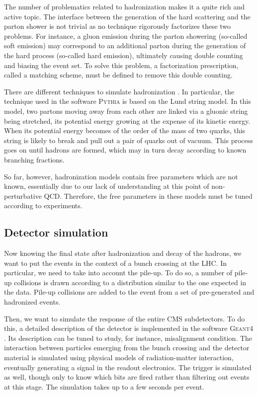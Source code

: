     The number of problematics related to hadronization makes it a quite rich and
    active topic. The interface between the generation of the hard scattering
    and the parton shower is not trivial as no technique rigorously factorizes
    these two problems. For instance, a gluon emission during
    the parton showering (so-called soft emission) may correspond to an additional
    parton during the generation of the hard process (so-called hard emission),
    ultimately causing double counting and biasing the event set. To solve this
    problem, a factorization prescription, called a matching scheme, must be defined
    to remove this double counting.

    There are different techniques to simulate hadronization \cite{MCGenPDG}. In particular, the
    technique used in the software \textsc{Pythia} is based on the Lund string
    model. In this model, two partons moving away from each other are linked
    via a gluonic string being stretched, its potential energy growing at
    the expense of its kinetic energy. When its potential energy becomes of the
    order of the mass of two quarks, this string is likely to break and pull
    out a pair of quarks out of vacuum. This process goes on until
    hadrons are formed, which may in turn decay according to known branching
    fractions.

    So far, however, hadronization models contain free parameters which are not known,
    essentially due to our lack of understanding at this point of non-perturbative
    QCD. Therefore, the free parameters in these models must be tuned according to
    experiments.

    \subsection{Detector simulation}

    Now knowing the final state after hadronization and decay of the hadrons, we
    want to put the events in the context of a bunch crossing at the LHC. In
    particular, we need to take into account the pile-up. To do so, a number of
    pile-up collisions is drawn according to a distribution similar to the
    one expected in the data. Pile-up collisions are added to the event from a
    set of pre-generated and hadronized events.

    Then, we want to simulate the response of the entire CMS subdetectors. To do
    this, a detailed description of the detector is implemented in the software
    \textsc{Geant4} \cite{Geant4}. Its description can be tuned to study, for instance,
    misalignment condition. The interaction between particles emerging from
    the bunch crossing and the detector material is simulated using physical
    models of radiation-matter interaction, eventually generating a signal in
    the readout electronics. The trigger is simulated as well, though only to know
    which bits are fired rather than filtering out events at this stage. The
    simulation takes up to a few seconds per event.

